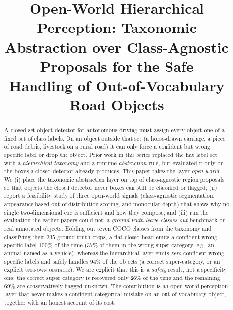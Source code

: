 \documentclass[conference]{IEEEtran}
\begin{document}
\title{Open-World Hierarchical Perception: Taxonomic\\
Abstraction over Class-Agnostic Proposals for the Safe\\
Handling of Out-of-Vocabulary Road Objects}

\author{
}

\maketitle

\begin{abstract}
A closed-set object detector for autonomous driving must assign every object one
of a fixed set of class labels. On an object outside that set (a horse-drawn
carriage, a piece of road debris, livestock on a rural road) it can only force a
confident but wrong specific label or drop the object. Prior work in this series
replaced the flat label set with a \emph{hierarchical taxonomy} and a runtime
\emph{abstraction} rule, but evaluated it only on the boxes a closed detector
already produces. This paper takes the layer \emph{open-world}. We (i) place the
taxonomic abstraction layer on top of class-agnostic region proposals so that
objects the closed detector never boxes can still be classified or flagged; (ii)
report a feasibility study of three open-world signals (class-agnostic
segmentation, appearance-based out-of-distribution scoring, and monocular
depth) that shows why no single two-dimensional cue is sufficient and how they
compose; and (iii) run the evaluation the earlier papers could not: a
\emph{ground-truth leave-classes-out} benchmark on real annotated objects. Holding
out seven COCO classes from the taxonomy and classifying their $235$ ground-truth
crops, a flat closed head emits a confident wrong specific label $100\%$ of the
time ($37\%$ of them in the wrong super-category, e.g.\ an animal named as a
vehicle), whereas the hierarchical layer emits \emph{zero} confident wrong
specific labels and safely handles $94\%$ of the objects (a correct
super-category, or an explicit \textsc{unknown obstacle}). We are explicit that
this is a \emph{safety} result, not a specificity one: the correct super-category
is recovered only $26\%$ of the time and the remaining $69\%$ are conservatively
flagged unknown. The contribution is an open-world perception layer that never
makes a confident categorical mistake on an out-of-vocabulary object, together
with an honest account of its cost.
\end{abstract}
\end{document}

